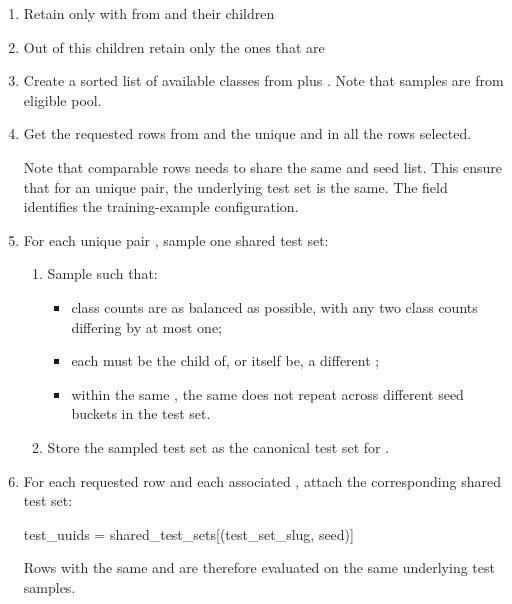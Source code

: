 \documentclass[11pt]{article}
\begin{document}
\begin{enumerate}

  \item Retain only  with  from 
   and their children 
  \item Out of this children retain only the ones that are 
  \item Create a sorted list of available classes from  plus \termNoParameterChangeClass.
  Note that \termNoParameterChangeClass samples are from eligible  pool.

  \item Get the requested rows from  and the unique  and  in all the rows selected.

  Note that comparable rows needs to share the same  and seed list. This ensure that for an unique  pair, the underlying test set is the same.
  The field  identifies the training-example configuration.

  \item For each unique pair , sample one shared test set:
  \begin{enumerate}
    \item Sample   such that:
    \begin{itemize}
      \item class counts are as balanced as possible, with any two class counts differing by at most one;
      \item each  must be the child of, or itself be, a different ;
      \item within the same , the same  does not repeat across different seed buckets in the test set.
    \end{itemize}
    \item Store the sampled test set as the canonical test set for .
  \end{enumerate}

  \item For each requested row and each associated , attach the corresponding shared test set:
  \begin{DocCode}
    test_uuids = shared_test_sets[(test_set_slug, seed)]
  \end{DocCode}
  Rows with the same  and  are therefore evaluated on the same underlying test samples.


\end{enumerate}
\end{document}
